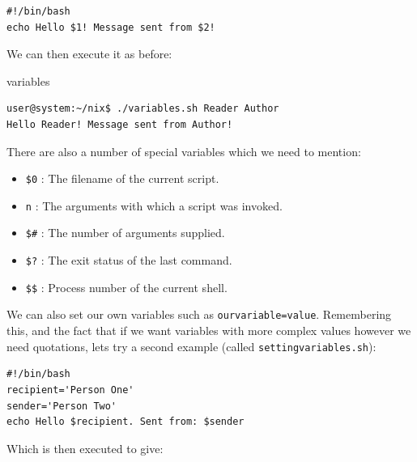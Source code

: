 \documentclass[11pt]{article}
\begin{document}
\begin{listing}[H]
\begin{verbatim}
#!/bin/bash
echo Hello $1! Message sent from $2!
\end{verbatim}
\end{listing}

We can then execute it as before:\\

\begin{listing}[H]
\caption{variables}\vspace{-0.1in}
\begin{verbatim}
user@system:~/nix$ ./variables.sh Reader Author
Hello Reader! Message sent from Author!
\end{verbatim}
\end{listing}

There are also a number of special variables which we need to mention:
\begin{itemize}
\item \texttt{\$0} : The filename of the current script.
\item \texttt{n} :  The arguments with which a script was invoked.
\item \texttt{\$\#} : The number of arguments supplied.
\item \texttt{\$?} : The exit status of the last command.
\item \texttt{\$\$} : Process number of the current shell.
\end{itemize}

We can also set our own variables such as \texttt{ourvariable=value}. Remembering this, and the fact that if  we want variables with more complex values however we need quotations, lets try a second example (called \texttt{settingvariables.sh}):\\

\begin{listing}[H]
\begin{verbatim}
#!/bin/bash
recipient='Person One'
sender='Person Two'
echo Hello $recipient. Sent from: $sender
\end{verbatim}
\end{listing}

\noindent
Which is then executed to give:\\
\end{document}
